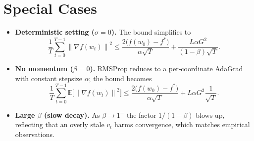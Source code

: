 \documentclass{article}
\newcommand{\E}{\mathbb{E}}
\newcommand{\norm}[1]{\left\|#1\right\|}
\begin{document}
\section*{Special Cases}
\begin{itemize}
\item \textbf{Deterministic setting ($\sigma=0$).} The bound simplifies to
\[
\frac{1}{T}\sum_{t=0}^{T-1}\norm{\nabla f(w_{t})}^{2}\le
\frac{2\big(f(w_{0})-f^{*}\big)}{\alpha\sqrt{T}}
+\frac{L\alpha G^{2}}{(1-\beta)\sqrt{T}}.
\]
\item \textbf{No momentum ($\beta=0$).} RMSProp reduces to a per‑coordinate AdaGrad with constant stepsize $\alpha$; the bound becomes
\[
\frac{1}{T}\sum_{t=0}^{T-1}\E\!\big[\norm{\nabla f(w_{t})}^{2}\big]
\le
\frac{2\big(f(w_{0})-f^{*}\big)}{\alpha\sqrt{T}}
+L\alpha G^{2}\frac{1}{\sqrt{T}}.
\]
\item \textbf{Large $\beta$ (slow decay).} As $\beta\to1^{-}$ the factor $1/(1-\beta)$ blows up, reflecting that an overly stale $v_{t}$ harms convergence, which matches empirical observations.
\end{itemize}
\end{document}
